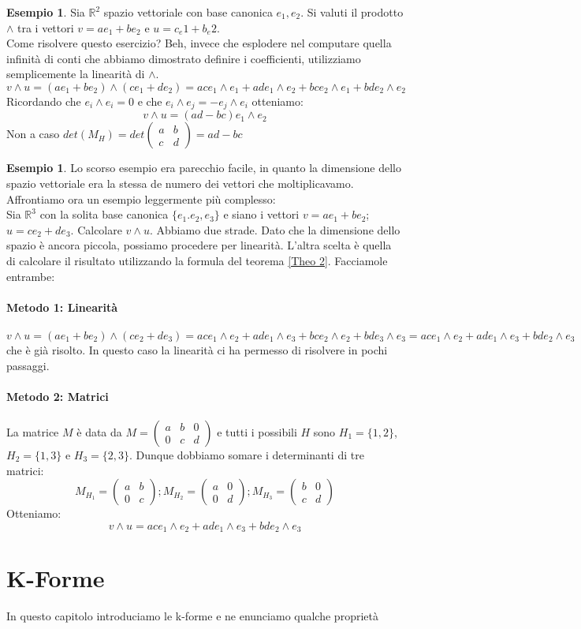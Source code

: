 \documentclass[12pt,a4paper]{report}
\theoremstyle{definition}
\theoremstyle{Theorem}
\theoremstyle{definition}
\newtheorem{Ex}[Def]{Esempio}
\theoremstyle{definition}
\theoremstyle{definition}
\begin{document}
\begin{Ex}
	Sia $\mathbb{R}^2$ spazio vettoriale con base canonica $e_1,e_2$. Si valuti il prodotto $\wedge$ tra i vettori $v=ae_1+be_2$ e $u=c_e1+b_e2$.\\
	Come risolvere questo esercizio? Beh, invece che esplodere nel computare quella infinità di conti che abbiamo dimostrato definire i coefficienti, utilizziamo semplicemente la linearità di $\wedge$.
	$$v\wedge u=(ae_1+be_2)\wedge(ce_1+de_2)=ace_1\wedge e_1+ade_1\wedge e_2+bce_2\wedge e_1+bde_2\wedge e_2$$ 
	Ricordando che $e_i\wedge e_i=0$ e che $e_i\wedge e_j=-e_j\wedge e_i$ otteniamo:
	$$v\wedge u=(ad-bc)e_1\wedge e_2$$
	Non a caso $det(M_H)=det\begin{pmatrix}
		a&b\\c&d
	\end{pmatrix}=ad-bc$
\end{Ex}
\begin{Ex}
	Lo scorso esempio era parecchio facile, in quanto la dimensione dello spazio vettoriale era la stessa de numero dei vettori che moltiplicavamo. Affrontiamo ora un esempio leggermente più complesso:\\
	Sia $\mathbb{R}^3$ con la solita base canonica $\{e_1.e_2,e_3\}$ e siano i vettori $v=ae_1+be_2$; $u=ce_2+de_3$. Calcolare $v\wedge u$. Abbiamo due strade. Dato che la dimensione dello spazio è ancora piccola, possiamo procedere per linearità. L'altra scelta è quella di calcolare il risultato utilizzando la formula del teorema \ref{Theo 2}. Facciamole entrambe:\\\\
	\textbf{Metodo 1: Linearità}\\
	\\
	$v\wedge u=(ae_1+be_2)\wedge(ce_2+de_3)=ace_1\wedge e_2+ade_1\wedge e_3+bce_2\wedge e_2+bde_3\wedge e_3=ace_1\wedge e_2+ade_1\wedge e_3+bde_2\wedge e_3$ che è già risolto. In questo caso la linearità ci ha permesso di risolvere in pochi passaggi.\\
	\\
	\textbf{Metodo 2: Matrici}\\
	\\
	La matrice $M$ è data da $M=\begin{pmatrix}
		a&b&0\\0&c&d
\end{pmatrix}$ e tutti i possibili $H$ sono $H_1=\{1,2\}$,$H_2=\{1,3\}$ e $H_3=\{2,3\}$. Dunque dobbiamo somare i determinanti di tre matrici:\\
$$M_{H_1}=\begin{pmatrix}
	a&b\\0&c
\end{pmatrix};
M_{H_2}=\begin{pmatrix}
a&0\\0&d
\end{pmatrix};
M_{H_3}=\begin{pmatrix}
	b&0\\c&d
\end{pmatrix}$$ 
Otteniamo:
$$v\wedge u=ace_1\wedge e_2+ade_1\wedge e_3+bde_2\wedge e_3$$
\end{Ex}
\chapter{K-Forme}
In questo capitolo introduciamo le k-forme e ne enunciamo qualche proprietà
\end{document}
